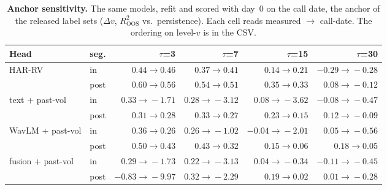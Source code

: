 \begin{table}[t]
\centering
\footnotesize
\setlength{\tabcolsep}{3.5pt}
\begin{tabular}{llrrrr}
\toprule
Head & seg. & $\tau$=3 & $\tau$=7 & $\tau$=15 & $\tau$=30 \\
\midrule
\multirow{2}{*}{HAR-RV} & in & $0.44\!\to\!0.46$ & $0.37\!\to\!0.41$ & $0.14\!\to\!0.21$ & $-0.29\!\to\!-0.28$ \\
 & post & $0.60\!\to\!0.56$ & $0.54\!\to\!0.51$ & $0.35\!\to\!0.33$ & $0.08\!\to\!-0.12$ \\
\multirow{2}{*}{text + past-vol} & in & $0.33\!\to\!-1.71$ & $0.28\!\to\!-3.12$ & $0.08\!\to\!-3.62$ & $-0.08\!\to\!-0.47$ \\
 & post & $0.31\!\to\!0.28$ & $0.33\!\to\!0.27$ & $0.23\!\to\!0.15$ & $0.12\!\to\!-0.09$ \\
\multirow{2}{*}{WavLM + past-vol} & in & $0.36\!\to\!0.26$ & $0.26\!\to\!-1.02$ & $-0.04\!\to\!-2.01$ & $0.05\!\to\!-0.56$ \\
 & post & $0.50\!\to\!0.43$ & $0.43\!\to\!0.32$ & $0.15\!\to\!0.06$ & $0.18\!\to\!0.05$ \\
\multirow{2}{*}{fusion + past-vol} & in & $0.29\!\to\!-1.73$ & $0.22\!\to\!-3.13$ & $0.04\!\to\!-0.34$ & $-0.11\!\to\!-0.45$ \\
 & post & $-0.83\!\to\!-9.97$ & $0.32\!\to\!-2.29$ & $0.19\!\to\!0.02$ & $0.01\!\to\!-0.28$ \\
\bottomrule
\end{tabular}
\caption{\textbf{Anchor sensitivity.} The same models, refit and scored with
day~0 on the call date, the anchor of the released label sets ($\Delta v$,
$R^2_{\mathrm{OOS}}$ vs.\ persistence). Each cell reads measured $\to$ call-date.
The ordering on level-$v$ is in the CSV.}
\label{tab:lookahead-assumed}
\end{table}
